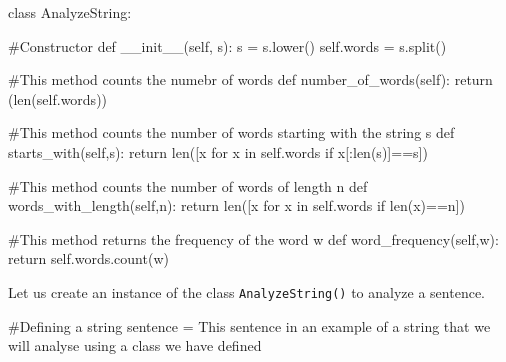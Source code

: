 \documentclass[
  letterpaper,
  DIV=11,
  numbers=noendperiod]{scrreprt}
\newenvironment{Shaded}{\begin{snugshade}}{\end{snugshade}}
\newcommand{\BuiltInTok}[1]{\textcolor[rgb]{0.00,0.23,0.31}{#1}}
\newcommand{\CommentTok}[1]{\textcolor[rgb]{0.37,0.37,0.37}{#1}}
\newcommand{\ControlFlowTok}[1]{\textcolor[rgb]{0.00,0.23,0.31}{#1}}
\newcommand{\FunctionTok}[1]{\textcolor[rgb]{0.28,0.35,0.67}{#1}}
\newcommand{\KeywordTok}[1]{\textcolor[rgb]{0.00,0.23,0.31}{#1}}
\newcommand{\NormalTok}[1]{\textcolor[rgb]{0.00,0.23,0.31}{#1}}
\newcommand{\OperatorTok}[1]{\textcolor[rgb]{0.37,0.37,0.37}{#1}}
\newcommand{\StringTok}[1]{\textcolor[rgb]{0.13,0.47,0.30}{#1}}
\newcommand{\VariableTok}[1]{\textcolor[rgb]{0.07,0.07,0.07}{#1}}
\begin{document}
\begin{Shaded}
\begin{Highlighting}[]
\KeywordTok{class}\NormalTok{ AnalyzeString:}
    
    \CommentTok{\#Constructor}
    \KeywordTok{def} \FunctionTok{\_\_init\_\_}\NormalTok{(}\VariableTok{self}\NormalTok{, s):}
\NormalTok{        s }\OperatorTok{=}\NormalTok{ s.lower()}
        \VariableTok{self}\NormalTok{.words }\OperatorTok{=}\NormalTok{ s.split()}
    
    \CommentTok{\#This method counts the numebr of words}
    \KeywordTok{def}\NormalTok{ number\_of\_words(}\VariableTok{self}\NormalTok{):}
        \ControlFlowTok{return}\NormalTok{ (}\BuiltInTok{len}\NormalTok{(}\VariableTok{self}\NormalTok{.words))}
    
    \CommentTok{\#This method counts the number of words starting with the string s}
    \KeywordTok{def}\NormalTok{ starts\_with(}\VariableTok{self}\NormalTok{,s):}
        \ControlFlowTok{return} \BuiltInTok{len}\NormalTok{([x }\ControlFlowTok{for}\NormalTok{ x }\KeywordTok{in} \VariableTok{self}\NormalTok{.words }\ControlFlowTok{if}\NormalTok{ x[:}\BuiltInTok{len}\NormalTok{(s)]}\OperatorTok{==}\NormalTok{s])}
    
    \CommentTok{\#This method counts the number of words of length n}
    \KeywordTok{def}\NormalTok{ words\_with\_length(}\VariableTok{self}\NormalTok{,n):}
        \ControlFlowTok{return} \BuiltInTok{len}\NormalTok{([x }\ControlFlowTok{for}\NormalTok{ x }\KeywordTok{in} \VariableTok{self}\NormalTok{.words }\ControlFlowTok{if} \BuiltInTok{len}\NormalTok{(x)}\OperatorTok{==}\NormalTok{n])}
    
    \CommentTok{\#This method returns the frequency of the word w}
    \KeywordTok{def}\NormalTok{ word\_frequency(}\VariableTok{self}\NormalTok{,w):}
        \ControlFlowTok{return} \VariableTok{self}\NormalTok{.words.count(w)}
\end{Highlighting}
\end{Shaded}

Let us create an instance of the class \texttt{AnalyzeString()} to
analyze a sentence.

\begin{Shaded}
\begin{Highlighting}[]
\CommentTok{\#Defining a string}
\NormalTok{sentence }\OperatorTok{=} \StringTok{\textquotesingle{}This sentence in an example of a string that we will analyse using a class we have defined\textquotesingle{}}
\end{Highlighting}
\end{Shaded}
\end{document}
